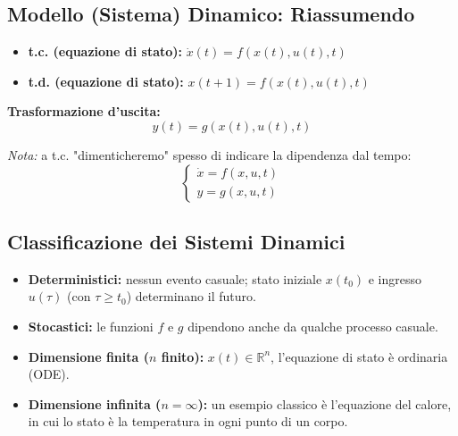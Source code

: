 \documentclass[11pt,a4paper]{article}
\begin{document}
\subsection{Modello (Sistema) Dinamico: Riassumendo}
\begin{itemize}
    \item \textbf{t.c. (equazione di stato):} $\dot{x}(t) = f(x(t), u(t), t)$
    \item \textbf{t.d. (equazione di stato):} $x(t+1) = f(x(t), u(t), t)$
\end{itemize}
\textbf{Trasformazione d'uscita:}
$$y(t) = g(x(t), u(t), t)$$

\textit{Nota:} a t.c. "dimenticheremo" spesso di indicare la dipendenza dal tempo:
$$ \begin{cases} 
\dot{x} = f(x, u, t) \\ 
y = g(x, u, t) 
\end{cases} $$

\subsection{Classificazione dei Sistemi Dinamici}
\begin{itemize}
    \item \textbf{Deterministici:} nessun evento casuale; stato iniziale $x(t_0)$ e ingresso $u(\tau)$ (con $\tau \ge t_0$) determinano il futuro.
    \item \textbf{Stocastici:} le funzioni $f$ e $g$ dipendono anche da qualche processo casuale.
    \item \textbf{Dimensione finita ($n$ finito):} $x(t) \in \mathbb{R}^n$, l'equazione di stato è ordinaria (ODE).
    \item \textbf{Dimensione infinita ($n = \infty$):} un esempio classico è l'equazione del calore, in cui lo stato è la temperatura in ogni punto di un corpo.
\end{itemize}
\end{document}
